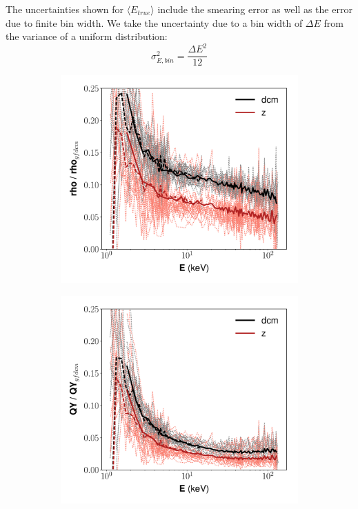 The uncertainties shown for $\langle E_{true} \rangle$ include the smearing error as well as the error due to finite bin width. We take the uncertainty due to a bin width of $\Delta E$ from the variance of a uniform distribution:
\begin{equation}
\sigma_{E,bin}^2=\frac{\Delta E^2}{12}
\end{equation}
\begin{figure}[!h]
\centering
\begin{subfigure}{0.5\linewidth}
\centering
  \includegraphics[width=\linewidth]{Figures/rho_ratio_final.pdf}
\caption{}
\end{subfigure}%
\begin{subfigure}{0.5\linewidth}
\centering
  \includegraphics[width=\linewidth]{Figures/QY_ratio_final.pdf}

\end{subfigure}
\end{figure}
